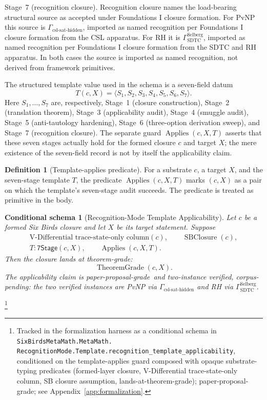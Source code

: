 \documentclass[11pt]{article}
\newcommand{\VDTSO}{V-Differential trace-state-only column}
\newcommand{\StageOne}{Stage~1 (closure construction)}
\newcommand{\StageTwo}{Stage~2 (translation theorem)}
\newcommand{\StageThree}{Stage~3 (applicability audit)}
\newcommand{\StageFour}{Stage~4 (smuggle audit)}
\newcommand{\StageFive}{Stage~5 (anti-tautology hardening)}
\newcommand{\StageSix}{Stage~6 (three-option derivation sweep)}
\newcommand{\StageSeven}{Stage~7 (recognition closure)}
\newcommand{\PPGrade}{paper-proposal-grade}
\newcommand{\TwoInstance}{two-instance verified, corpus-pending}
\newtheorem{schema}[theorem]{Conditional schema}
\theoremstyle{definition}
\newtheorem{definition}[theorem]{Definition}
\begin{document}
\StageSeven. Recognition closure names the load-bearing structural source
as accepted under Foundations I closure formation. For PvNP this source is
\(\Gamma_{\text{csl-sat-hidden}}\), imported as named recognition per
Foundations I closure formation from the CSL apparatus. For RH it is
\(\Gamma_{\text{SDTC}}^{\text{Selberg}}\), imported as named recognition
per Foundations I closure formation from the SDTC and RH apparatus. In
both cases the source is imported as named recognition, not derived from
framework primitives.

The structured template value used in the schema is a seven-field datum
\[
  T(c,X)=\langle S_1,S_2,S_3,S_4,S_5,S_6,S_7\rangle .
\]
Here \(S_1,\ldots,S_7\) are, respectively, \StageOne, \StageTwo,
\StageThree, \StageFour, \StageFive, \StageSix, and \StageSeven.  The
separate guard \(\operatorname{Applies}(c,X,T)\) asserts
that these seven stages actually hold for the formed closure \(c\) and
target \(X\); the mere existence of the seven-field record is not by
itself the applicability claim.

\begin{definition}[Template-applies predicate]\label{def:applies}
For a substrate \(c\), a target \(X\), and the seven-stage template
\(T\), the predicate \(\operatorname{Applies}(c,X,T)\) marks \((c,X)\)
as a pair on which the template's seven-stage audit succeeds.  The
predicate is treated as primitive in the body.
\end{definition}

\begin{schema}[Recognition-Mode Template Applicability]\label{thm:template-applicability}
Let \(c\) be a formed Six Birds closure and let \(X\) be its target
statement.  Suppose
\[
  \begin{gathered}
    \mbox{\VDTSO}(c),\qquad \operatorname{SBClosure}(c),\\
    T:\mathsf{7Stage}(c,X),\qquad
    \operatorname{Applies}(c,X,T).
  \end{gathered}
\]
Then the closure lands at theorem-grade:
\[
  \operatorname{TheoremGrade}(c,X).
\]
The applicability claim is \PPGrade\ and \TwoInstance: the two verified
instances are PvNP via \(\Gamma_{\text{csl-sat-hidden}}\) and RH via
\(\Gamma_{\text{SDTC}}^{\text{Selberg}}\).
\end{schema}\footnote{\raggedright Tracked in the formalization
harness as a conditional schema in
\texttt{SixBirdsMetaMath.MetaMath.\allowbreak
RecognitionMode.Template.\allowbreak recognition\_template\_applicability},
conditioned on the template-applies guard composed with opaque
substrate-typing predicates (formed-layer closure, V-Differential
trace-state-only column, SB closure assumption, lands-at-theorem-grade);
paper-proposal-grade; see Appendix~\ref{app:formalization}.}
\end{document}
